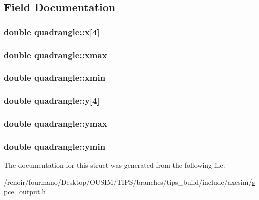 \subsection{Field Documentation}
\hypertarget{structquadrangle_a2838cc41fa0d8d867757b05ed1cfdbc2}{
\subsubsection[{x}]{\setlength{\rightskip}{0pt plus 5cm}double {\bf quadrangle::x}\mbox{[}4\mbox{]}}}
\label{structquadrangle_a2838cc41fa0d8d867757b05ed1cfdbc2}
\hypertarget{structquadrangle_a07cdc1aa08d997f3ecf4a4527e1958b1}{
\subsubsection[{xmax}]{\setlength{\rightskip}{0pt plus 5cm}double {\bf quadrangle::xmax}}}
\label{structquadrangle_a07cdc1aa08d997f3ecf4a4527e1958b1}
\hypertarget{structquadrangle_a4a693bbae5ab2389a2e89aba2cd1ec6c}{
\subsubsection[{xmin}]{\setlength{\rightskip}{0pt plus 5cm}double {\bf quadrangle::xmin}}}
\label{structquadrangle_a4a693bbae5ab2389a2e89aba2cd1ec6c}
\hypertarget{structquadrangle_a7a086b8fde718d39d81a1d0a5855beff}{
\subsubsection[{y}]{\setlength{\rightskip}{0pt plus 5cm}double {\bf quadrangle::y}\mbox{[}4\mbox{]}}}
\label{structquadrangle_a7a086b8fde718d39d81a1d0a5855beff}
\hypertarget{structquadrangle_a9cd9de4d5ad81c686c3bbea6093d5f2a}{
\subsubsection[{ymax}]{\setlength{\rightskip}{0pt plus 5cm}double {\bf quadrangle::ymax}}}
\label{structquadrangle_a9cd9de4d5ad81c686c3bbea6093d5f2a}
\hypertarget{structquadrangle_a28f1d44685c1b1fc1302c23fa53e3c82}{
\subsubsection[{ymin}]{\setlength{\rightskip}{0pt plus 5cm}double {\bf quadrangle::ymin}}}
\label{structquadrangle_a28f1d44685c1b1fc1302c23fa53e3c82}


The documentation for this struct was generated from the following file:\begin{DoxyCompactItemize}
\item 
/renoir/fourmano/Desktop/OUSIM/TIPS/branches/tips\_\-build/include/axesim/\hyperlink{spce__output_8h}{spce\_\-output.h}\end{DoxyCompactItemize}
